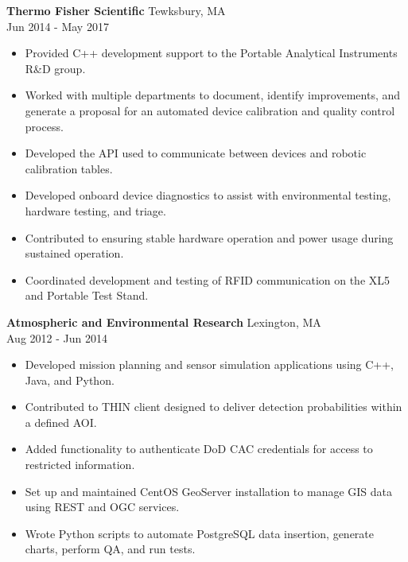 \documentclass[10pt]{article}
\newcommand{\verticalspace}{\vspace{1.5mm}}
\begin{document}
\verticalspace

{\bf Thermo Fisher Scientific} \hfill Tewksbury, MA \\
 \hfill Jun 2014 - May 2017
\begin{itemize}
\item Provided C++ development support to the Portable Analytical Instruments R\&D group.

\item Worked with multiple departments to document, identify improvements, and generate a proposal for an automated device calibration and quality control process.
\item Developed the API used to communicate between devices and robotic calibration tables.
\item Developed onboard device diagnostics to assist with environmental testing, hardware testing, and triage.
\item Contributed to ensuring stable hardware operation and power usage during sustained operation.
\item Coordinated development and testing of RFID communication on the XL5 and Portable Test Stand. 
\end{itemize}

\verticalspace

{\bf Atmospheric and Environmental Research} \hfill Lexington, MA \\
 \hfill Aug 2012 - Jun 2014
\begin{itemize}
\item Developed mission planning and sensor simulation applications using C++, Java, and Python.
\item Contributed to THIN client designed to deliver detection probabilities within a defined AOI.
\item Added functionality to authenticate DoD CAC credentials for access to restricted information.
\item Set up and maintained CentOS GeoServer installation to manage GIS data using REST and OGC services.
\item Wrote Python scripts to automate PostgreSQL data insertion, generate charts, perform QA, and run tests.
\end{itemize}

\verticalspace
\end{document}
